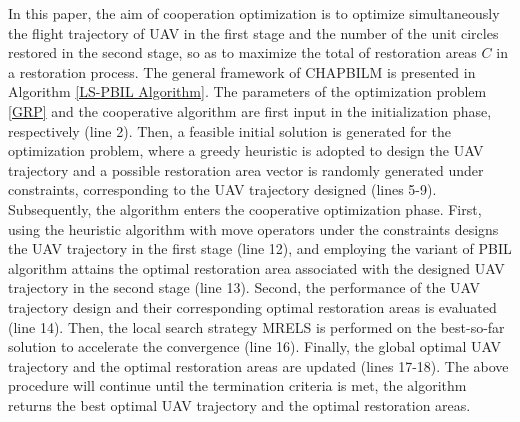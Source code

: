 \documentclass[preprint,5pt]{elsarticle}
\begin{document}
In this paper, the aim of cooperation optimization is to optimize simultaneously the flight trajectory of UAV in the first stage and the number of the unit circles restored in the second stage, so as to maximize the total of restoration areas $C$ in a restoration process. The general framework of CHAPBILM is presented in Algorithm \ref{LS-PBIL Algorithm}. The parameters of the optimization problem \eqref{GRP} and the cooperative algorithm are first input in the initialization phase, respectively (line 2). Then, a feasible initial solution is generated for the optimization problem, where a greedy heuristic is adopted to design the UAV trajectory and a possible restoration area vector is randomly generated under constraints, corresponding to the UAV trajectory designed (lines 5-9). Subsequently, the algorithm enters the cooperative optimization phase. First, using the heuristic algorithm with move operators under the constraints designs the UAV trajectory in the first stage (line 12), and employing the variant of PBIL algorithm attains the optimal restoration area associated with the designed UAV trajectory in the second stage (line 13). Second, the performance of the UAV trajectory design and their corresponding optimal restoration areas is evaluated (line 14). Then, the local search strategy MRELS is performed on the best-so-far solution to accelerate the convergence (line 16). Finally, the global optimal UAV trajectory and the optimal restoration areas are updated (lines 17-18). The above procedure will continue until the termination criteria is met, the algorithm returns the best optimal UAV trajectory and the optimal restoration areas.
\end{document}
